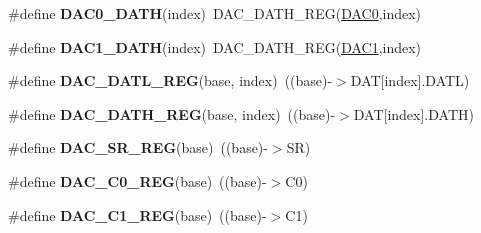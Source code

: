 \begin{DoxyCompactItemize}
\item 
\#define {\bfseries D\+A\+C0\+\_\+\+D\+A\+TH}(index)~D\+A\+C\+\_\+\+D\+A\+T\+H\+\_\+\+R\+EG(\hyperlink{group__DAC__Peripheral__Access__Layer_gadfe0025fe66918c644e110c3b055c955}{D\+A\+C0},index)\hypertarget{group__DAC__Register__Accessor__Macros_ga0c1025944a54ab896169911f32453cf1}{}\label{group__DAC__Register__Accessor__Macros_ga0c1025944a54ab896169911f32453cf1}

\item 
\#define {\bfseries D\+A\+C1\+\_\+\+D\+A\+TH}(index)~D\+A\+C\+\_\+\+D\+A\+T\+H\+\_\+\+R\+EG(\hyperlink{group__DAC__Peripheral__Access__Layer_gaffb5ff8779fa698f3c7165a617d56e4f}{D\+A\+C1},index)\hypertarget{group__DAC__Register__Accessor__Macros_ga58ff47a80b90d81ea8c86d2bccfa3a77}{}\label{group__DAC__Register__Accessor__Macros_ga58ff47a80b90d81ea8c86d2bccfa3a77}

\item 
\#define {\bfseries D\+A\+C\+\_\+\+D\+A\+T\+L\+\_\+\+R\+EG}(base,  index)~((base)-\/$>$D\+AT\mbox{[}index\mbox{]}.D\+A\+TL)\hypertarget{group__DAC__Register__Accessor__Macros_ga08d6968ef33456980d21911ea2ed00f5}{}\label{group__DAC__Register__Accessor__Macros_ga08d6968ef33456980d21911ea2ed00f5}

\item 
\#define {\bfseries D\+A\+C\+\_\+\+D\+A\+T\+H\+\_\+\+R\+EG}(base,  index)~((base)-\/$>$D\+AT\mbox{[}index\mbox{]}.D\+A\+TH)\hypertarget{group__DAC__Register__Accessor__Macros_ga53b85847dea8002316aa2880d5c27f68}{}\label{group__DAC__Register__Accessor__Macros_ga53b85847dea8002316aa2880d5c27f68}

\item 
\#define {\bfseries D\+A\+C\+\_\+\+S\+R\+\_\+\+R\+EG}(base)~((base)-\/$>$SR)\hypertarget{group__DAC__Register__Accessor__Macros_ga689d7e5290e37e3690b476afe279548c}{}\label{group__DAC__Register__Accessor__Macros_ga689d7e5290e37e3690b476afe279548c}

\item 
\#define {\bfseries D\+A\+C\+\_\+\+C0\+\_\+\+R\+EG}(base)~((base)-\/$>$C0)\hypertarget{group__DAC__Register__Accessor__Macros_ga535f8efe3924aa0e193dc9a57b4cae83}{}\label{group__DAC__Register__Accessor__Macros_ga535f8efe3924aa0e193dc9a57b4cae83}

\item 
\#define {\bfseries D\+A\+C\+\_\+\+C1\+\_\+\+R\+EG}(base)~((base)-\/$>$C1)\hypertarget{group__DAC__Register__Accessor__Macros_ga5177a56f528748e9c9e8138a130a289d}{}\label{group__DAC__Register__Accessor__Macros_ga5177a56f528748e9c9e8138a130a289d}


\end{DoxyCompactItemize}
